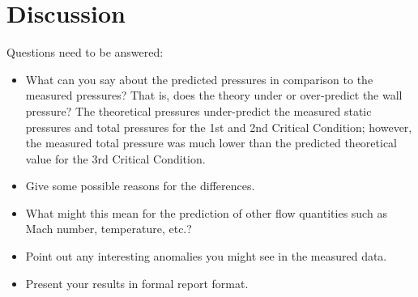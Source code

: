 \chapter{Discussion}
\label{cp:discussion}

Questions need to be answered:

\begin{itemize}
  \item What can you say about the predicted pressures in comparison to the measured pressures? That is, does the theory under or over‐predict the wall pressure?
  The theoretical pressures under-predict the measured static pressures and total pressures for the 1st and 2nd Critical Condition; however, the measured total pressure was much lower than the predicted theoretical value for the 3rd Critical Condition.
  \item Give some possible reasons for the differences.
  \item What might this mean for the prediction of other flow quantities such as Mach number, temperature, etc.?
  \item Point out any interesting anomalies you might see in the measured data.
  \item Present your results in formal report format.
\end{itemize}
  